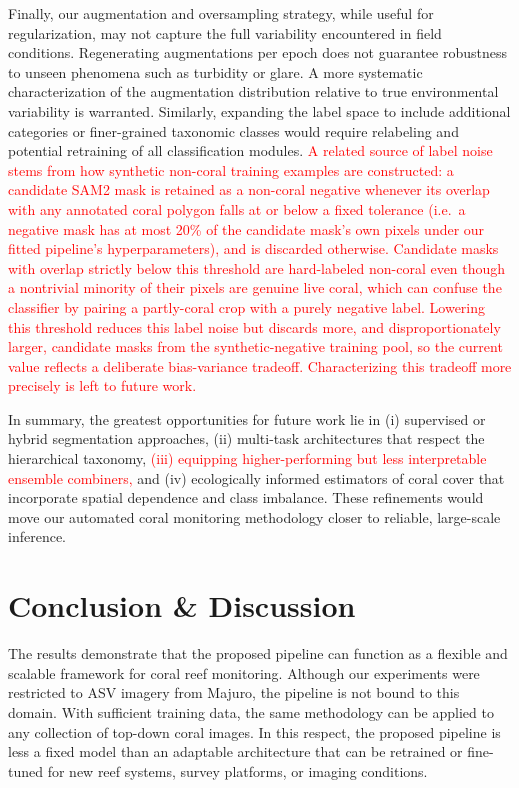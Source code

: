 \documentclass[11pt]{elsarticle}
\newcommand{\revadd}[1]{\textcolor{red}{#1}}
\begin{document}
Finally, our augmentation and oversampling strategy, while useful for regularization, may not capture the full variability encountered in field conditions. Regenerating augmentations per epoch does not guarantee robustness to unseen phenomena such as turbidity or glare. A more systematic characterization of the augmentation distribution relative to true environmental variability is warranted. Similarly, expanding the label space to include additional categories or finer-grained taxonomic classes would require relabeling and potential retraining of all classification modules. \revadd{A related source of label noise stems from how synthetic non-coral training examples are constructed: a candidate SAM2 mask is retained as a non-coral negative whenever its overlap with any annotated coral polygon falls at or below a fixed tolerance (i.e.\ a negative mask has at most 20\% of the candidate mask's own pixels under our fitted pipeline's hyperparameters), and is discarded otherwise. Candidate masks with overlap strictly below this threshold are hard-labeled non-coral even though a nontrivial minority of their pixels are genuine live coral, which can confuse the classifier by pairing a partly-coral crop with a purely negative label. Lowering this threshold reduces this label noise but discards more, and disproportionately larger, candidate masks from the synthetic-negative training pool, so the current value reflects a deliberate bias-variance tradeoff. Characterizing this tradeoff more precisely is left to future work.}

In summary, the greatest opportunities for future work lie in (i) supervised or hybrid segmentation approaches, (ii) multi-task architectures that respect the hierarchical taxonomy, \revadd{(iii) equipping higher-performing but less interpretable ensemble combiners,} and (iv) ecologically informed estimators of coral cover that incorporate spatial dependence and class imbalance. These refinements would move our automated coral monitoring methodology closer to reliable, large-scale inference.

\section{Conclusion \& Discussion}

The results demonstrate that the proposed pipeline can function as a flexible and scalable framework for coral reef monitoring. Although our experiments were restricted to ASV imagery from Majuro, the pipeline is not bound to this domain. With sufficient training data, the same methodology can be applied to any collection of top-down coral images. In this respect, the proposed pipeline is less a fixed model than an adaptable architecture that can be retrained or fine-tuned for new reef systems, survey platforms, or imaging conditions.
\end{document}
